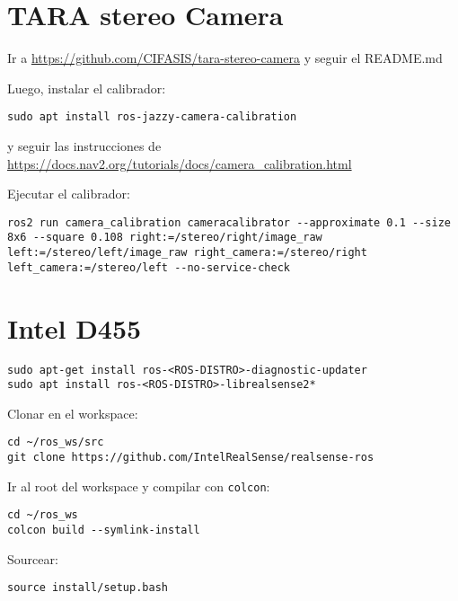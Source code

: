 \documentclass[apunte]{lcc}
\begin{document}
\maketitle

\section{TARA stereo Camera}

Ir a \url{https://github.com/CIFASIS/tara-stereo-camera} y seguir el README.md

Luego, instalar el calibrador:

\begin{lstlisting}[style=bash]
sudo apt install ros-jazzy-camera-calibration
\end{lstlisting}

y seguir las instrucciones de \url{https://docs.nav2.org/tutorials/docs/camera_calibration.html}

Ejecutar el calibrador:

\begin{lstlisting}[style=bash]
ros2 run camera_calibration cameracalibrator --approximate 0.1 --size 8x6 --square 0.108 right:=/stereo/right/image_raw left:=/stereo/left/image_raw right_camera:=/stereo/right left_camera:=/stereo/left --no-service-check
\end{lstlisting}


\section{Intel D455}

\begin{lstlisting}[style=bash]
sudo apt-get install ros-<ROS-DISTRO>-diagnostic-updater
sudo apt install ros-<ROS-DISTRO>-librealsense2*
\end{lstlisting}

Clonar en el workspace:
\begin{lstlisting}[style=bash]
cd ~/ros_ws/src
git clone https://github.com/IntelRealSense/realsense-ros
\end{lstlisting}

Ir al root del workspace y compilar con \lstinline{colcon}:
\begin{lstlisting}[style=bash]
cd ~/ros_ws
colcon build --symlink-install
\end{lstlisting}

Sourcear:
\begin{lstlisting}[style=bash]
source install/setup.bash
\end{lstlisting}
\end{document}
